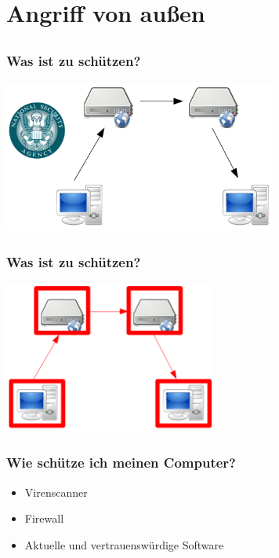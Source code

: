 \documentclass[12pt]{beamer}
\begin{document}
\section{Angriff von außen}
\subsection{}

\begin{frame}
    \frametitle{Was ist zu schützen?}
    \begin{center}
      \includegraphics[height=5cm]{img/fed-bad-guy.png}
    \end{center}
\end{frame}

\begin{frame}
    \frametitle{Was ist zu schützen?}
    \begin{center}
      \includegraphics[height=5cm]{img/fed-none.png}
    \end{center}
\end{frame}

\begin{frame}
    \frametitle{Wie schütze ich meinen Computer?}
    \begin{itemize}
      \item Virenscanner
      \item Firewall
      \item Aktuelle und vertrauenswürdige Software
    \end{itemize}
\end{frame}
\end{document}
